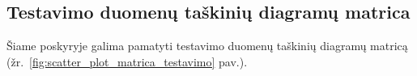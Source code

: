 \subsection{Testavimo duomenų taškinių diagramų matrica}
\label{subsec:testavimo_duomenu_taskiniu_diagramu_matrica}

Šiame poskyryje galima pamatyti testavimo duomenų taškinių diagramų matricą (žr.~\ref{fig:scatter_plot_matrica_testavimo} pav.).

